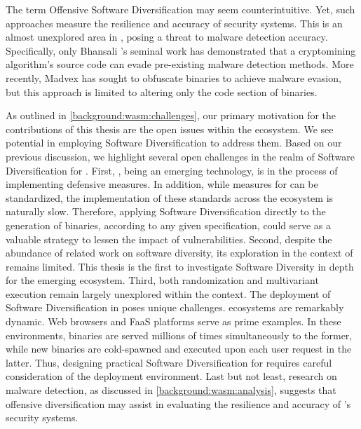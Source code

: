 The term Offensive Software Diversification may seem counterintuitive.
Yet, such approaches measure the resilience and accuracy of security systems. 
This is an almost unexplored area in \Wasm, posing a threat to malware detection accuracy. 
Specifically, only Bhansali \etal's seminal work\cite{10.1145/3507657.3528560} has demonstrated that a cryptomining algorithm's source code can evade pre-existing malware detection methods. 
More recently, Madvex \cite{madvex} has sought to obfuscate \Wasm binaries to achieve malware evasion, but this approach is limited to altering only the code section of \Wasm binaries.



\label{sota:openchallenges}
As outlined in \autoref{background:wasm:challenges}, our primary motivation for the contributions of this thesis are the open issues within the \Wasm ecosystem. 
We see potential in employing Software Diversification to address them. 
Based on our previous discussion, we highlight several open challenges in the realm of Software Diversification for \Wasm. 
First, \Wasm, being an emerging technology, is in the process of implementing defensive measures. 
In addition, while measures for \Wasm can be standardized, the implementation of these standards across the ecosystem is naturally slow. 
Therefore, applying Software Diversification directly to the generation of \Wasm binaries, according to any given specification, could serve as a valuable strategy to lessen the impact of vulnerabilities.
Second, despite the abundance of related work on software diversity, its exploration in the context of \Wasm remains limited. 
This thesis is the first to investigate Software Diversity in depth for the emerging \Wasm ecosystem.
Third, both randomization and multivariant execution remain largely unexplored within the \Wasm context. 
The deployment of Software Diversification in \Wasm poses unique challenges. 
\Wasm ecosystems are remarkably dynamic. 
Web browsers and FaaS platforms serve as prime examples. 
In these environments, \Wasm binaries are served millions of times simultaneously to the former, while new \Wasm binaries are cold-spawned and executed upon each user request in the latter. 
Thus, designing practical Software Diversification for \Wasm requires careful consideration of the deployment environment. 
Last but not least, research on malware detection, as discussed in \autoref{background:wasm:analysis}, suggests that offensive diversification may assist in evaluating the resilience and accuracy of \Wasm's security systems.


